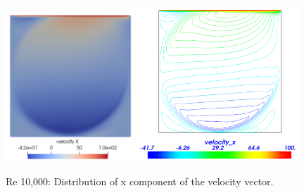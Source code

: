 \begin{figure}[H]
\centering
\includegraphics[width=0.43\textwidth]{DC_velocity_x_10k}
\includegraphics[width=0.54\textwidth]{DC_velocity_x_VTK_10k}
\caption{Re 10,000: Distribution of x component of the velocity vector.}\label{fg:DC_velocity_x_10k}
\end{figure} 

